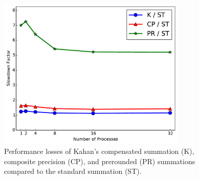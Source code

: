 \begin{figure}[!htb]
    \centering
    \includegraphics[width=0.80\textwidth]{chapter_2_figures/ratios.pdf}
    \caption{Performance losses of Kahan's compensated summation (K),
      composite precision (CP), and prerounded (PR) summations
      compared to the standard summation (ST).}
    \label{fig:compare_ratios}
\end{figure}


